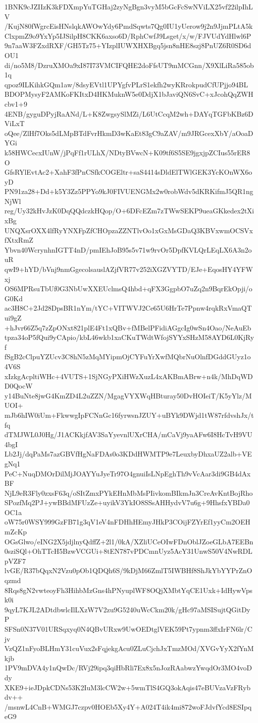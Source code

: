 1BNK9cJZIIzK3kFDXmpYuTGHaj2zyNgBgn3vyM5bGcFcSwNViLX25vf22ilpIhLV
/KujN80fWgrcEisHNslqkAWOwYdy6PmdSqwts7Qg0IU1yUerow9j2n9JjmPLtA5k
ClxpmZ9o9YxYp5IJSilpH8CKK6axso6D/RphCwfJ9Lsget/x/w/FJVUdYdHlwl6P
9n7aaW3FZxdRXF/GH5Tz75+YIzplIUWXHXBgq5jsn8nHE8szj8PnUZ6R0SD6dOU1
di/no5M8/DzruXMOa9xI87I73VMCIFQHE2doFfsUT9mMCGnn/X9XlLiRa585ob1q
qpoz9ILKihkGQm1aw/8dsyEVtl1UPYgfvPLrS1ekfh2wyKRrokpudCfUPjjo94BL
BDOPMysyF2AMKoFKItxD4HKMuknW5e0DdjX1bJaviQN6SvC+xJcohQqZWHcbv1+9
4ENB/gyguDPyjRaANd/L+K8ZwgsySlMZi/L6UtCcqM2wh+DAYqTGFbKBz6DViLxT
oQee/ZlHf7Oks5dLMpBTdFvrHkmD3wKaEt83gC9aZAV/m9JRGcexXbY/aOoaDYGi
k58HWCecxIUnW/jPqFf1rULhX/NDtyBVwcN+K09tf6S5SE9jgxjpZCIus55rER8O
GfsRYlEvtAc2+XahF3fPnCSfkCOGEltr+saS4414sDldElTWlGEK3YcKOnWX6oyD
PN91za28+Dd+k5Y3Zz5PPYo9kJ0FIVUENGMx2w0robWdv5dKRKifmJ5QR1ngNjWl
reg/Uy32kHvJzK0DqQQdczkHQop/O+6DFcEZm7zTWwSEKP9ueaGKkedex2tXixBg
UNQXsrOXX4lfRyYNXFpZfCHOpzaZZNTlvOo1xGxMsGDaQ3KBVxwmOCSVxfXtxRmZ
Ybvn40WcrynhnIGTT4nD/pmIEhJoB95s5v71w9rvOr5DpfKVLQrLEqLX6A3n2ouR
qwI9+hYD/bVnj9nmGgecolsauslAZjfVR77v252iXGZVYTD/EJe+EqosHY4YFWxj
OS6MPRsuTbUf0G3NbUwXXEUclmsQ4hbd+qFX3GgpbO7uZq2n9BqrEkOpji/oG0Kd
ac3H8C+2Jd28DpsBR1nYm/tYC+VITWVJ2Ce65U6HrTe7Ppnw4rqkRxVmaQTui9gZ
+hJvr66Z5q7zZpONxt821plE4Ft1xQBv+fMBelPFidiAGgcIg0wSn4Oao/NeAuEb
tpza34oP5fQui9yCApio/kbL46wkb1xaCKuTWdtWfojSYYxSHzM58AYD6L0KjRyf
fSgB2cClpuYZUcv3C8hN5zMqMYipmOjCYFuYrXwfMQbrNuOlnfDGddGUyz1o4V6S
xIzkgAcpltiWHc+4VUTS+1SjNGyPXiHWzXuzL4xAKBmABrw+n4k/MhDqWDD0QocW
y14BuNte8jwG4KmZD4L2uZZN/MgagVYXWqHBturay50DvHOIeiT/K5yYlz/MUOI+
mJb6hIW0iUm+FkwwgIpFCNnGc16fyrwsnJZUY+uBYk9DWjd1tW87rfdvshJx/tfq
dTMJWL0J0Hg/J1ACKkjfAV3SaYyevnlUXrCHA/mCaVj9yaAFw6I8HcTvH9VU4bgI
Lb2Jj/dqPaMs7azGBVfHgNaFDAs0o3KDdHWMTP9e7LeuxbyDhxaUZ2alb+VEgNq1
PeC+NuqDMOrDilMjJOAYYuJyeTr97O4gnuiIsLNpEghTh9vVcAar3di9GB4dAxBF
NjL9eR3Fly0zxsF63q/oSItZmxPYkEHnMbMsPIivkomBIkmJn3CreAvKntBojRho
SPozfMq2PJ+ywBBdMFUzZe+uyikV3YkIO8SSsAHHydvV7u6g+9HhsfxYBDa0OC1a
oW75r0WSY999GzFB71g3qV1eV4nFDHhHEmyJHkP3COijFZYrEf1yyCm2OEHmZcKp
OGsGlwo/eING2X5jdjlnyQdffZ+2l1/0kA/XZliUCeOIwFDnOblJZoeGLbA7EEBn
0sziSQl+OhTTcH5BzwVCGUi+8tEN787vPDCmnUyz5AcY31UnwS50V4NwRDLpVZF7
lvGE/R37bQqxN2Vzu0pOb1QDQh6S/9kDjM66ZmlT5IWBHf8ShJkYbYYPrZnOqzmd
8Rqs8gN2vwteoyFh3HihbMzGns4hPNyuplWF8OQjXMbtYqCE1Uxk+IdHywVpsk0i
9qyL7KJL2ADtdbwlcIlLXzW7V2zu9G5240uWcCkm20k/gHc97aMSISujtQGitDyP
SFSn0N37V01URSqxyq0N4QBvURxw9UwOEDtglVEK59Pt7ypnm3ffxIrFN6lr/Cjv
VzQZ1nFyoBLHmY31cuVux2sFqjekgAcu0ZLuCjchJxTmzMOd/XVGvYyX2fYnMkjb
1PV9mDVA4y1nQwDc/RVj29ipq3qiHbRli7Ex8x5nJozRAabwzYwqdOr3MO4voDdy
XKE9+ieJDpkCDNs53K2IuM3lcCW2w+5wmTlS4GQ3okAqis47eBUVzaVzFRybdv++
/msnwL4CnB+WMGJ7czpv0HOEb5Xy4Y+A024T4ik4mi872woFJdvfYcd8ESIpqeG9
